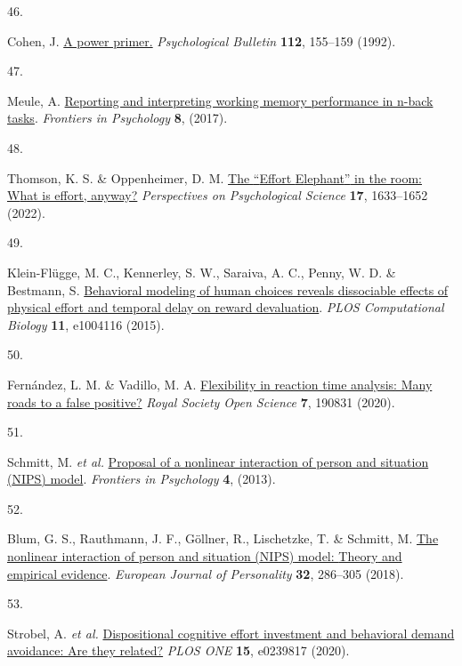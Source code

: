 \documentclass[
  man,floatsintext]{apa6}
\newlength{\cslhangindent}
\newlength{\csllabelwidth}
\newlength{\cslentryspacingunit} %
\newenvironment{CSLReferences}[2] %
 {%
  \setlength{\parindent}{0pt}
  \ifodd #1
  \let\oldpar\par
  \def\par{\hangindent=\cslhangindent\oldpar}
  \fi
  \setlength{\parskip}{#2\cslentryspacingunit}
 }%
 {}
\newcommand{\CSLLeftMargin}[1]{\parbox[t]{\csllabelwidth}{#1}}
\newcommand{\CSLRightInline}[1]{\parbox[t]{\linewidth - \csllabelwidth}{#1}\break}
\begin{document}
\begin{CSLReferences}{0}{0}
\leavevmode{}%
\CSLLeftMargin{46. }%
\CSLRightInline{Cohen, J. \href{https://doi.org/10.1037/0033-2909.112.1.155}{A power primer.} \emph{Psychological Bulletin} \textbf{112}, 155--159 (1992).}

\leavevmode{}%
\CSLLeftMargin{47. }%
\CSLRightInline{Meule, A. \href{https://doi.org/10.3389/fpsyg.2017.00352}{Reporting and interpreting working memory performance in n-back tasks}. \emph{Frontiers in Psychology} \textbf{8}, (2017).}

\leavevmode{}%
\CSLLeftMargin{48. }%
\CSLRightInline{Thomson, K. S. \& Oppenheimer, D. M. \href{https://doi.org/10.1177/17456916211064896}{The {``}{E}ffort {E}lephant{''} in the room: {W}hat is effort, anyway?} \emph{Perspectives on Psychological Science} \textbf{17}, 1633--1652 (2022).}

\leavevmode{}%
\CSLLeftMargin{49. }%
\CSLRightInline{Klein-Flügge, M. C., Kennerley, S. W., Saraiva, A. C., Penny, W. D. \& Bestmann, S. \href{https://doi.org/10.1371/journal.pcbi.1004116}{Behavioral modeling of human choices reveals dissociable effects of physical effort and temporal delay on reward devaluation}. \emph{{PLOS} Computational Biology} \textbf{11}, e1004116 (2015).}

\leavevmode{}%
\CSLLeftMargin{50. }%
\CSLRightInline{Fernández, L. M. \& Vadillo, M. A. \href{https://doi.org/10.1098/rsos.190831}{Flexibility in reaction time analysis: Many roads to a false positive?} \emph{Royal Society Open Science} \textbf{7}, 190831 (2020).}

\leavevmode{}%
\CSLLeftMargin{51. }%
\CSLRightInline{Schmitt, M. \emph{et al.} \href{https://doi.org/10.3389/fpsyg.2013.00499}{Proposal of a nonlinear interaction of person and situation ({NIPS}) model}. \emph{Frontiers in Psychology} \textbf{4}, (2013).}

\leavevmode{}%
\CSLLeftMargin{52. }%
\CSLRightInline{Blum, G. S., Rauthmann, J. F., Göllner, R., Lischetzke, T. \& Schmitt, M. \href{https://doi.org/10.1002/per.2138}{The nonlinear interaction of person and situation ({NIPS)} model: {Theory} and empirical evidence}. \emph{European Journal of Personality} \textbf{32}, 286--305 (2018).}

\leavevmode{}%
\CSLLeftMargin{53. }%
\CSLRightInline{Strobel, A. \emph{et al.} \href{https://doi.org/10.1371/journal.pone.0239817}{Dispositional cognitive effort investment and behavioral demand avoidance: {Are} they related?} \emph{PLOS ONE} \textbf{15}, e0239817 (2020).}


\end{CSLReferences}
\end{document}
